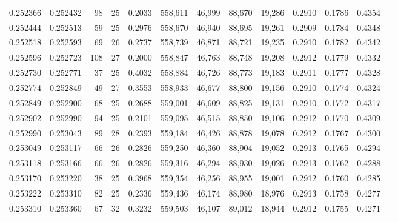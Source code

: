 \begin{tabular}{rrrrrrrrrrrrr}
0.252366 & 0.252432 &  98 &  25 &                                     0.2033 & 558,611 &  46,999 &  88,670 &  19,286 & 0.2910 & 0.1786 & 0.4354 \\
0.252444 & 0.252513 &  59 &  25 &                                     0.2976 & 558,670 &  46,940 &  88,695 &  19,261 & 0.2909 & 0.1784 & 0.4348 \\
0.252518 & 0.252593 &  69 &  26 &                                     0.2737 & 558,739 &  46,871 &  88,721 &  19,235 & 0.2910 & 0.1782 & 0.4342 \\
0.252596 & 0.252723 & 108 &  27 &                                     0.2000 & 558,847 &  46,763 &  88,748 &  19,208 & 0.2912 & 0.1779 & 0.4332 \\
0.252730 & 0.252771 &  37 &  25 &                                     0.4032 & 558,884 &  46,726 &  88,773 &  19,183 & 0.2911 & 0.1777 & 0.4328 \\
0.252774 & 0.252849 &  49 &  27 &                                     0.3553 & 558,933 &  46,677 &  88,800 &  19,156 & 0.2910 & 0.1774 & 0.4324 \\
0.252849 & 0.252900 &  68 &  25 &                                     0.2688 & 559,001 &  46,609 &  88,825 &  19,131 & 0.2910 & 0.1772 & 0.4317 \\
0.252902 & 0.252990 &  94 &  25 &                                     0.2101 & 559,095 &  46,515 &  88,850 &  19,106 & 0.2912 & 0.1770 & 0.4309 \\
0.252990 & 0.253043 &  89 &  28 &                                     0.2393 & 559,184 &  46,426 &  88,878 &  19,078 & 0.2912 & 0.1767 & 0.4300 \\
0.253049 & 0.253117 &  66 &  26 &                                     0.2826 & 559,250 &  46,360 &  88,904 &  19,052 & 0.2913 & 0.1765 & 0.4294 \\
0.253118 & 0.253166 &  66 &  26 &                                     0.2826 & 559,316 &  46,294 &  88,930 &  19,026 & 0.2913 & 0.1762 & 0.4288 \\
0.253170 & 0.253220 &  38 &  25 &                                     0.3968 & 559,354 &  46,256 &  88,955 &  19,001 & 0.2912 & 0.1760 & 0.4285 \\
0.253222 & 0.253310 &  82 &  25 &                                     0.2336 & 559,436 &  46,174 &  88,980 &  18,976 & 0.2913 & 0.1758 & 0.4277 \\
0.253310 & 0.253360 &  67 &  32 &                                     0.3232 & 559,503 &  46,107 &  89,012 &  18,944 & 0.2912 & 0.1755 & 0.4271 \\

\end{tabular}
